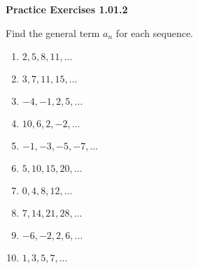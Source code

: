 \vspace{0.3ex}
\noindent\textbf{Practice Exercises 1.01.2}

\vspace{0.2ex}

Find the general term $a_n$ for each sequence.
\begin{multicols}{2}
\begin{enumerate}
    \item $2, 5, 8, 11, \dots$
    \item $3, 7, 11, 15, \dots$
    \item $-4, -1, 2, 5, \dots$
    \item $10, 6, 2, -2, \dots$
    \item $-1, -3, -5, -7, \dots$
    \item $5, 10, 15, 20, \dots$
    \item $0, 4, 8, 12, \dots$
    \item $7, 14, 21, 28, \dots$
    \item $-6, -2, 2, 6, \dots$
    \item $1, 3, 5, 7, \dots$
    \end{enumerate}
    \end{multicols}
